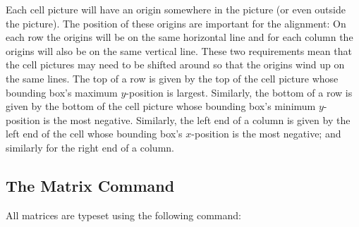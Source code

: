 Each cell picture will have an origin somewhere in the picture (or even outside
the picture). The position of these origins are important for the alignment: On
each row the origins will be on the same horizontal line and for each column
the origins will also be on the same vertical line. These two requirements mean
that the cell pictures may need to be shifted around so that the origins wind
up on the same lines. The top of a row is given by the top of the cell picture
whose bounding box's maximum $y$-position is largest. Similarly, the bottom of
a row is given by the bottom of the cell picture whose bounding box's minimum
$y$-position is the most negative. Similarly, the left end of a column is given
by the left end of the cell whose bounding box's $x$-position is the most
negative; and similarly for the right end of a column.
%
\begin{codeexample}[]
\end{codeexample}


\subsection{The Matrix Command}

All matrices are typeset using the following command:

